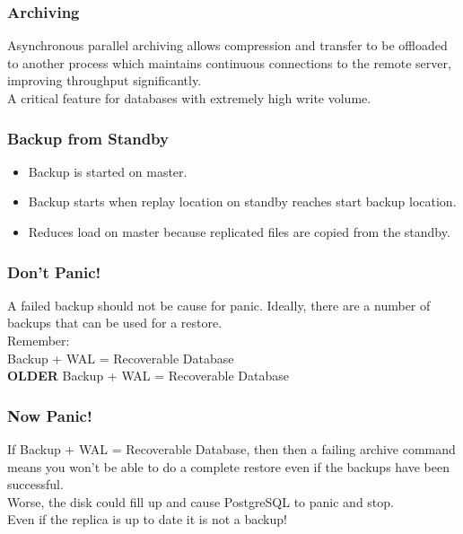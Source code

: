 \begin{frame}
    \frametitle{Archiving}

    Asynchronous parallel archiving allows compression and transfer to be offloaded to another process which maintains continuous connections to the remote server, improving throughput significantly.\\\pause
    \vspace{1em}
    A critical feature for databases with extremely high write volume.
\end{frame}

\begin{frame}
    \frametitle{Backup from Standby}

    \begin{itemize}
        \item Backup is started on master.\pause
        \item Backup starts when replay location on standby reaches start backup location.\pause
        \item Reduces load on master because replicated files are copied from the standby.
    \end{itemize}
\end{frame}

\begin{frame}
    \frametitle{Don't Panic!}

    A failed backup should not be cause for panic.  Ideally, there are a number of backups that can be used for a restore.\\
    \vspace{1em}
    Remember:\\
    \vspace{1em}
    Backup + WAL = Recoverable Database\\
    \textbf{OLDER} Backup + WAL = Recoverable Database
\end{frame}

\begin{frame}
    \frametitle{Now Panic!}

    If Backup + WAL = Recoverable Database, then then a failing archive command means you won't be able to do a complete restore even if the backups have been successful.\\
    \vspace{1em}
    Worse, the disk could fill up and cause PostgreSQL to panic and stop.\\
    \vspace{1em}
    Even if the replica is up to date it is not a backup!
\end{frame}

